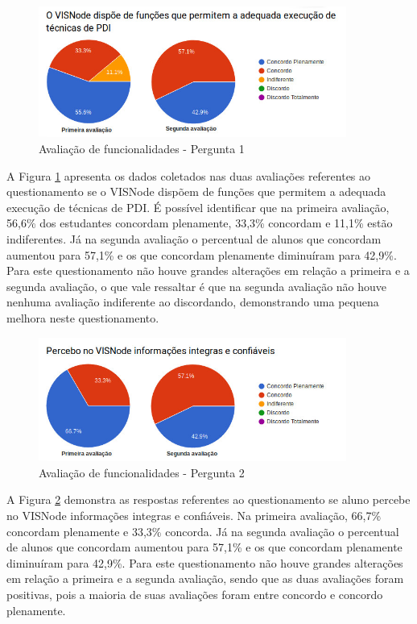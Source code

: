 \documentclass[
	12pt,				%
	oneside,			%
	a4paper,			%
	english,			%
	french,				%
	spanish,			%
	brazil,				%
	]{abntex2}
\begin{document}
\begin{figure}[H]
\centering
\caption{Avaliação de funcionalidades - Pergunta 1}\label{fig:avaliacaoFuncionalidades1}
\includegraphics[width=0.9\textwidth]{imagens/avaliacoes/avaliacao_funcionalidade_1.jpg}
\sourceAuthor
\end{figure}

A Figura \ref{fig:avaliacaoFuncionalidades1} apresenta os dados coletados nas duas avaliações referentes ao questionamento se o VISNode dispõem de funções que permitem a adequada execução de técnicas de PDI. É possível identificar que na primeira avaliação, 56,6\% dos estudantes concordam plenamente, 33,3\% concordam e 11,1\% estão indiferentes. Já na segunda avaliação o percentual de alunos que concordam aumentou para 57,1\% e os que concordam plenamente diminuíram para 42,9\%. Para este questionamento não houve grandes alterações em relação a primeira e a segunda avaliação, o que vale ressaltar é que na segunda avaliação não houve nenhuma avaliação indiferente ao discordando, demonstrando uma pequena melhora neste questionamento.

\begin{figure}[H]
\centering
\caption{Avaliação de funcionalidades - Pergunta 2}\label{fig:avaliacaoFuncionalidades2}
\includegraphics[width=0.9\textwidth]{imagens/avaliacoes/avaliacao_funcionalidade_2.jpg}
\sourceAuthor
\end{figure}

A Figura \ref{fig:avaliacaoFuncionalidades2} demonstra as respostas referentes ao questionamento se aluno percebe no VISNode informações integras e confiáveis. Na primeira avaliação, 66,7\% concordam plenamente e 33,3\% concorda. Já na segunda avaliação o percentual de alunos que concordam aumentou para 57,1\% e os que concordam plenamente diminuíram para 42,9\%. Para este questionamento não houve grandes alterações em relação a primeira e a segunda avaliação, sendo que as duas avaliações foram positivas, pois a maioria de suas avaliações foram entre concordo e concordo plenamente.
\end{document}
